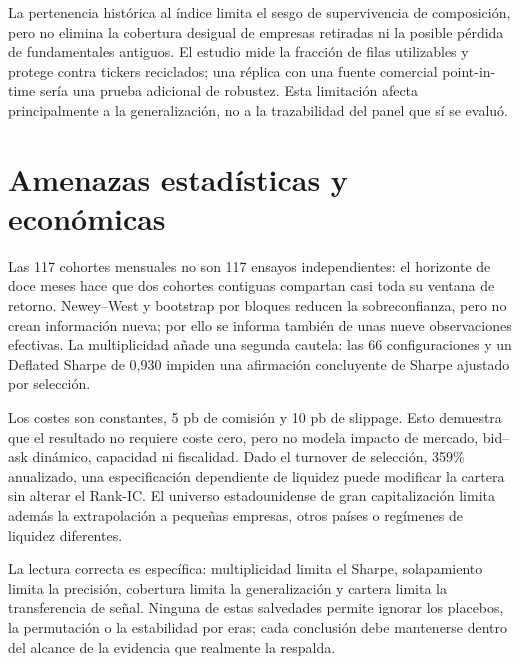 La pertenencia histórica al índice limita el sesgo de supervivencia de composición, pero no elimina
la cobertura desigual de empresas retiradas ni la posible pérdida de fundamentales antiguos. El
estudio mide la fracción de filas utilizables y protege contra tickers reciclados; una réplica con
una fuente comercial point-in-time sería una prueba adicional de robustez. Esta limitación afecta
principalmente a la generalización, no a la trazabilidad del panel que sí se evaluó.

\section{Amenazas estadísticas y económicas}

Las 117 cohortes mensuales no son 117 ensayos independientes: el horizonte de doce meses hace que
dos cohortes contiguas compartan casi toda su ventana de retorno. Newey--West y bootstrap por bloques
reducen la sobreconfianza, pero no crean información nueva; por ello se informa también de unas
nueve observaciones efectivas. La multiplicidad añade una segunda cautela: las 66 configuraciones y
un Deflated Sharpe de 0,930 impiden una afirmación concluyente de Sharpe ajustado por selección.

Los costes son constantes, 5 pb de comisión y 10 pb de slippage. Esto demuestra que el resultado no
requiere coste cero, pero no modela impacto de mercado, bid--ask dinámico, capacidad ni fiscalidad.
Dado el turnover de selección, 359\% anualizado, una especificación dependiente de liquidez puede
modificar la cartera sin alterar el Rank-IC. El universo estadounidense de gran capitalización limita
además la extrapolación a pequeñas empresas, otros países o regímenes de liquidez diferentes.

La lectura correcta es específica: multiplicidad limita el Sharpe, solapamiento limita la precisión,
cobertura limita la generalización y cartera limita la transferencia de señal. Ninguna de estas
salvedades permite ignorar los placebos, la permutación o la estabilidad por eras; cada conclusión
debe mantenerse dentro del alcance de la evidencia que realmente la respalda.
